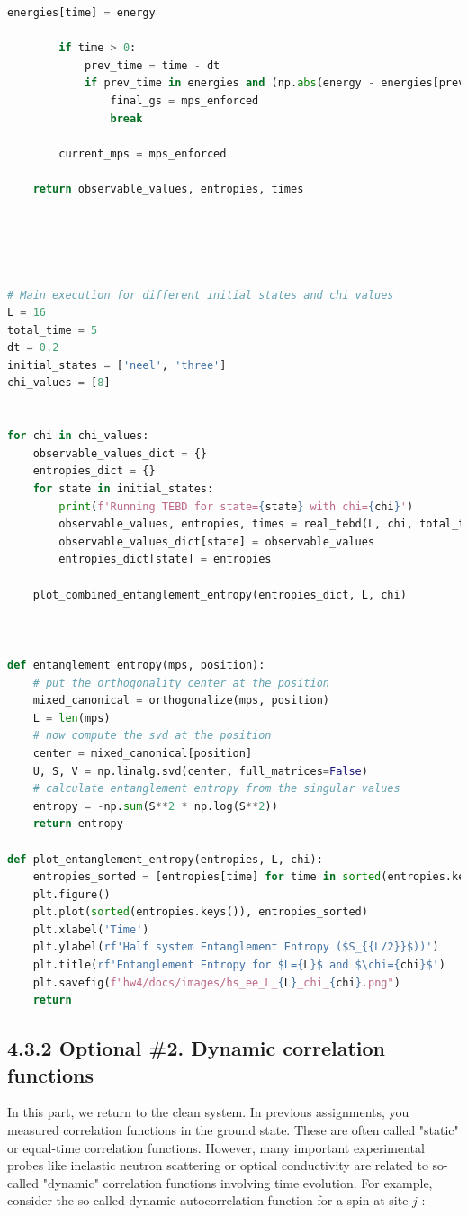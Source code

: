 \documentclass[12pt]{article}
\begin{document}
\begin{lstlisting}[language=Python]
        energies[time] = energy

        if time > 0:
            prev_time = time - dt
            if prev_time in energies and (np.abs(energy - energies[prev_time]) / np.abs(energy)) < 1e-8:
                final_gs = mps_enforced
                break

        current_mps = mps_enforced

    return observable_values, entropies, times





# Main execution for different initial states and chi values
L = 16
total_time = 5
dt = 0.2
initial_states = ['neel', 'three']
chi_values = [8]


for chi in chi_values:
    observable_values_dict = {}
    entropies_dict = {}
    for state in initial_states:
        print(f'Running TEBD for state={state} with chi={chi}')
        observable_values, entropies, times = real_tebd(L, chi, total_time, dt, state)
        observable_values_dict[state] = observable_values
        entropies_dict[state] = entropies

    plot_combined_entanglement_entropy(entropies_dict, L, chi)

    

def entanglement_entropy(mps, position):
    # put the orthogonality center at the position
    mixed_canonical = orthogonalize(mps, position)
    L = len(mps)
    # now compute the svd at the position
    center = mixed_canonical[position]
    U, S, V = np.linalg.svd(center, full_matrices=False)
    # calculate entanglement entropy from the singular values
    entropy = -np.sum(S**2 * np.log(S**2))
    return entropy

def plot_entanglement_entropy(entropies, L, chi):
    entropies_sorted = [entropies[time] for time in sorted(entropies.keys())]
    plt.figure()
    plt.plot(sorted(entropies.keys()), entropies_sorted)
    plt.xlabel('Time')
    plt.ylabel(rf'Half system Entanglement Entropy ($S_{{L/2}}$))')
    plt.title(rf'Entanglement Entropy for $L={L}$ and $\chi={chi}$')
    plt.savefig(f"hw4/docs/images/hs_ee_L_{L}_chi_{chi}.png")
    return
\end{lstlisting}
\newpage





\subsection*{4.3.2 Optional \#2. Dynamic correlation functions}
In this part, we return to the clean system. In previous assignments, you measured correlation functions in the ground state. These are often called "static" or equal-time correlation functions. However, many important experimental probes like inelastic neutron scattering or optical conductivity are related to so-called "dynamic" correlation functions involving time evolution. For example, consider the so-called dynamic autocorrelation function for a spin at site $j$ :
\end{document}
